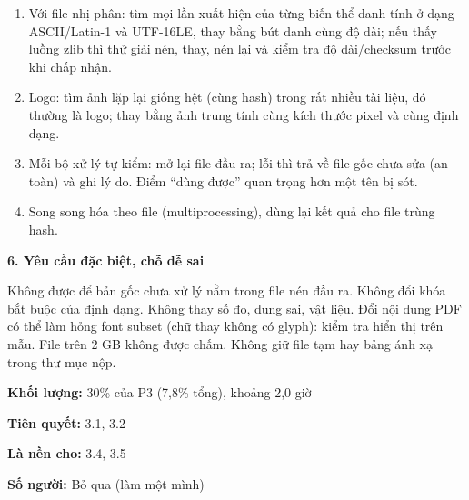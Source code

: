 \documentclass[a4paper,12pt]{article}
\newcommand{\partbox}[3]{%
\begin{mdframed}[nobreak=true,linecolor=#1,linewidth=1.2pt,topline=false,rightline=false,bottomline=false,leftmargin=0pt,rightmargin=0pt,innerleftmargin=10pt,backgroundcolor=#1!6]
\textbf{\color{#1}#2}\par\smallskip #3
\end{mdframed}}
\newcommand{\metabox}[5]{%
\begin{mdframed}[nobreak=true,linecolor=#1,linewidth=1pt,leftmargin=0pt,rightmargin=0pt,backgroundcolor=#1!15]
\textbf{Khối lượng:} #2\par
\textbf{Tiên quyết:} #3\par
\textbf{Là nền cho:} #4\par
\textbf{Số người:} #5
\end{mdframed}}
\begin{document}
{\begin{enumerate}[leftmargin=1.4em]
  \item Với file nhị phân: tìm mọi lần xuất hiện của từng biến thể danh tính ở dạng ASCII/Latin-1 và UTF-16LE, thay bằng bút danh cùng độ dài; nếu thấy luồng zlib thì thử giải nén, thay, nén lại và kiểm tra độ dài/checksum trước khi chấp nhận.
  \item Logo: tìm ảnh lặp lại giống hệt (cùng hash) trong rất nhiều tài liệu, đó thường là logo; thay bằng ảnh trung tính cùng kích thước pixel và cùng định dạng.
  \item Mỗi bộ xử lý tự kiểm: mở lại file đầu ra; lỗi thì trả về file gốc chưa sửa (an toàn) và ghi lý do. Điểm ``dùng được'' quan trọng hơn một tên bị sót.
  \item Song song hóa theo file (multiprocessing), dùng lại kết quả cho file trùng hash.
\end{enumerate}}
\partbox{p3}{6. Yêu cầu đặc biệt, chỗ dễ sai}{Không được để bản gốc chưa xử lý nằm trong file nén đầu ra. Không đổi khóa bắt buộc của định dạng. Không thay số đo, dung sai, vật liệu. Đổi nội dung PDF có thể làm hỏng font subset (chữ thay không có glyph): kiểm tra hiển thị trên mẫu. File trên 2 GB không được chấm. Không giữ file tạm hay bảng ánh xạ trong thư mục nộp.}
\metabox{p3}{30\% của P3 (7,8\% tổng), khoảng 2,0 giờ}{3.1, 3.2}{3.4, 3.5}{Bỏ qua (làm một mình)}

\end{document}
